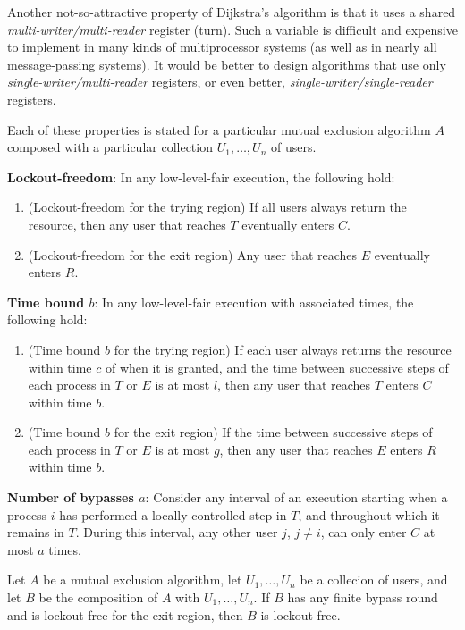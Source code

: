 \documentclass[11pt]{article}
\begin{document}
Another not-so-attractive property of Dijkstra's algorithm is that it uses a shared
\emph{multi-writer/multi-reader} register (turn). Such a variable is difficult and expensive to implement in
many kinds of multiprocessor systems (as well as in nearly all message-passing systems). It would be
better to design algorithms that use only \emph{single-writer/multi-reader} registers, or even better,
\emph{single-writer/single-reader} registers.

Each of these properties is stated for a particular mutual exclusion algorithm \(A\) composed with a
particular collection \(U_1,\dots,U_n\) of users.

\textbf{Lockout-freedom}: In any low-level-fair execution, the following hold:
\begin{enumerate}
\item (Lockout-freedom for the trying region) If all users always return the resource, then any user that
reaches \(T\) eventually enters \(C\).
\item (Lockout-freedom for the exit region) Any user that reaches \(E\) eventually enters \(R\).
\end{enumerate}

\textbf{Time bound \(b\)}: In any low-level-fair execution with associated times, the following hold:
\begin{enumerate}
\item (Time bound \(b\) for the trying region) If each user always returns the resource within time \(c\)
of when it is granted, and the time between successive steps of each process in \(T\) or \(E\) is
at most \(l\), then any user that reaches \(T\) enters \(C\) within time \(b\).
\item (Time bound \(b\) for the exit region) If the time between successive steps of each process in
\(T\) or \(E\) is at most \(g\), then any user that reaches \(E\) enters \(R\) within time \(b\).
\end{enumerate}

\textbf{Number of bypasses \(a\)}: Consider any interval of an execution starting when a process \(i\) has
performed a locally controlled step in \(T\), and throughout which it remains in \(T\). During this
interval, any other user \(j\), \(j\neq i\), can only enter \(C\) at most \(a\) times.

\begin{theorem}[]
Let \(A\) be a mutual exclusion algorithm, let \(U_1,\dots,U_n\) be a collecion of users, and let
\(B\) be the composition of \(A\) with \(U_1,\dots,U_n\). If \(B\) has any finite bypass round and is
lockout-free for the exit region, then \(B\) is lockout-free.
\end{theorem}
\end{document}
